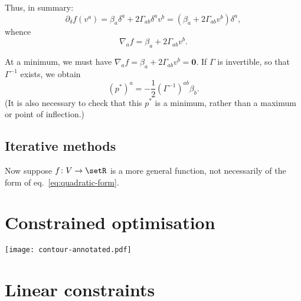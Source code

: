 \documentclass[10pt, a4paper]{article}
\newcommand{\bzero}{\mathbold{0}} %
\begin{document}
Thus, in summary:
\begin{equation*}
  \partial_\delta f(v^a) = \beta_a \delta^a + 2\Gamma_{ab}\delta^av^b =(\beta_a+2\Gamma_{ab}v^b)\delta^a,
\end{equation*}
whence
\begin{equation*}
  \nabla_af = \beta_a+2\Gamma_{ab}v^b.
\end{equation*}

At a minimum, we must have
$\nabla_af = \beta_a+2\Gamma_{ab}v^b = \bzero$. If $\Gamma$ is invertible, so that
$\Gamma^{-1}$ exists, we obtain
\begin{equation*}
  {(p^*)}^a = -\frac{1}{2}{(\Gamma^{-1})}^{ab}\beta_b.
\end{equation*}
(It is also necessary to check that this $p^*$ is a minimum, rather
than a maximum or point of inflection.)

\subsection{Iterative methods}

Now suppose $f\colon V\to\setR$ is a more general function, not
necessarily of the form of eq.~\eqref{eq:quadratic-form}. 

\section{Constrained optimisation}
\begin{marginfigure}
  \centering
  \texttt{[image: contour-annotated.pdf]}
\end{marginfigure}


\section{Linear constraints}
\end{document}
